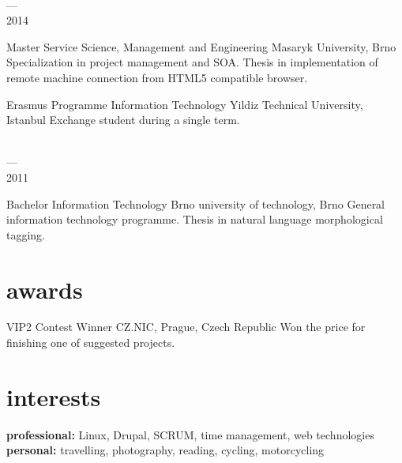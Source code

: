 \documentclass[]{friggeri-cv} %
\begin{document}
\begin{entrylist}
  \entry
  {\parbox[t]{2cm}{ \\ --- \\ 2014}}
  {Master {\normalfont Service Science, Management and Engineering}}
  {Masaryk University, Brno}
  {
    \thesis
    {Specialization in project management and SOA.}
    {Thesis in implementation of remote machine connection from HTML5 compatible browser.}
  }
  \entry
  {\parbox[t]{2cm}{}}
  {Erasmus Programme {\normalfont Information Technology}}
  {Yildiz Technical University, Istanbul}
  {Exchange student during a single term.\medskip}
  \entry
  {\parbox[t]{2cm}{ \\ --- \\ 2011}}
  {Bachelor {\normalfont Information Technology}}
  {Brno university of technology, Brno}
  {
    \thesis
    {General information technology programme.}
    {Thesis in natural language morphological tagging.}
  }
\end{entrylist}


\section{awards}

\begin{entrylist}
\entry
{\parbox[t]{2cm}{}}
{VIP2 Contest Winner}
{CZ.NIC, Prague, Czech Republic}
{Won the price for finishing one of suggested projects.}
\end{entrylist}


\section{interests}

\textbf{professional:} Linux, Drupal, SCRUM, time management, web technologies \\
\textbf{personal:} travelling, photography, reading, cycling, motorcycling
\end{document}
